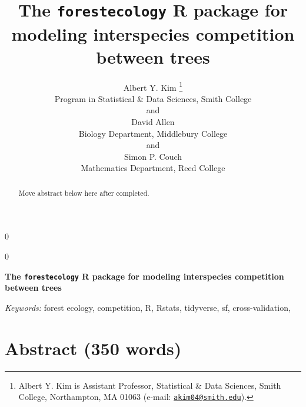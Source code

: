 \documentclass[12pt]{article}
\newcommand{\blind}{0}
\begin{document}
\def\spacingset#1{\renewcommand{\baselinestretch}%
{#1}\small\normalsize} \spacingset{1}



\blind
{
  \title{\bf The \texttt{forestecology} R package for modeling interspecies
competition between trees}

  \author{
        Albert Y. Kim \thanks{Albert Y. Kim is Assistant Professor, Statistical \& Data Sciences,
Smith College, Northampton, MA 01063 (e-mail:
\href{mailto:akim04@smith.edu}{\nolinkurl{akim04@smith.edu}}).} \\
    Program in Statistical \& Data Sciences, Smith College\\
     and \\     David Allen \\
    Biology Department, Middlebury College\\
     and \\     Simon P. Couch \\
    Mathematics Department, Reed College\\
      }
  \maketitle
} \fi

\blind
{
  \bigskip
  \bigskip
  \bigskip
  \begin{center}
    {\LARGE\bf The \texttt{forestecology} R package for modeling interspecies
competition between trees}
  \end{center}
  \medskip
} \fi

\bigskip
\begin{abstract}
Move abstract below here after completed.
\end{abstract}

\noindent%
{\it Keywords:} forest ecology, competition, R, Rstats, tidyverse, sf, cross-validation,
\vfill

\newpage
\spacingset{1.45} %

\linenumbers

\hypertarget{abstract-350-words}{%
\section*{Abstract (350 words)}\label{abstract-350-words}}
\end{document}
